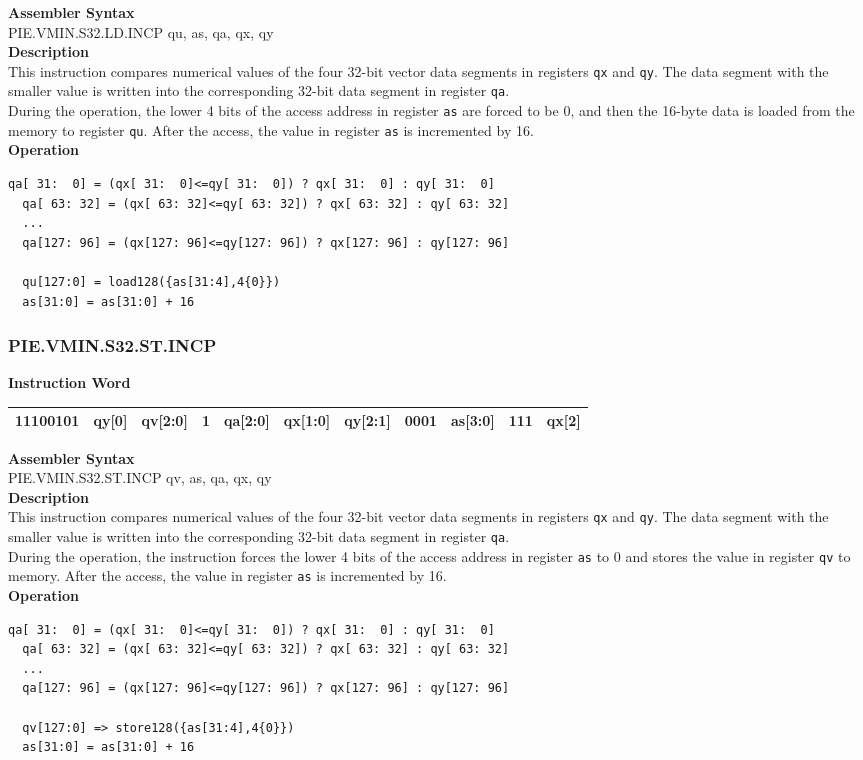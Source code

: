 \textbf{Assembler Syntax} \\
PIE.VMIN.S32.LD.INCP qu, as, qa, qx, qy \\
\textbf{Description} \\
This instruction compares numerical values of the four 32-bit vector data segments in registers \lstinline{qx} and \lstinline{qy}. The data segment with the smaller value is written into the corresponding 32-bit data segment in register \lstinline{qa}.\\
During the operation, the lower 4 bits of the access address in register \lstinline{as} are forced to be 0, and then the 16-byte data is loaded from the memory to register \lstinline{qu}. After the access, the value in register \lstinline{as} is incremented by 16.\\
\textbf{Operation}
\begin{lstlisting}[escapeinside=`?]
  qa[ 31:  0] = (qx[ 31:  0]<=qy[ 31:  0]) ? qx[ 31:  0] : qy[ 31:  0]
  qa[ 63: 32] = (qx[ 63: 32]<=qy[ 63: 32]) ? qx[ 63: 32] : qy[ 63: 32]
  ...
  qa[127: 96] = (qx[127: 96]<=qy[127: 96]) ? qx[127: 96] : qy[127: 96]

  qu[127:0] = load128({as[31:4],4{0}})
  as[31:0] = as[31:0] + 16
\end{lstlisting}

\newpage
\subsubsection{PIE.VMIN.S32.ST.INCP}\label{instruction:PIEVMINS32STINCP}
\setlength\tabcolsep{6pt}
\textbf{Instruction Word} \\
\begin{tabular}{|c|c|c|c|c|c|c|c|c|c|c|}
	\hline
	11100101 & qy[0] & qv[2:0] & 1 & qa[2:0] & qx[1:0] & qy[2:1] & 0001 & as[3:0] & 111 & qx[2] \\
	\hline
\end{tabular}

\textbf{Assembler Syntax} \\
PIE.VMIN.S32.ST.INCP qv, as, qa, qx, qy \\
\textbf{Description} \\
This instruction compares numerical values of the four 32-bit vector data segments in registers \lstinline{qx} and \lstinline{qy}. The data segment with the smaller value is written into the corresponding 32-bit data segment in register \lstinline{qa}.\\
During the operation, the instruction forces the lower 4 bits of the access address in register \lstinline{as} to 0 and stores the value in register \lstinline{qv} to memory. After the access, the value in register \lstinline{as} is incremented by 16.\\
\textbf{Operation}
\begin{lstlisting}[escapeinside=`?]
  qa[ 31:  0] = (qx[ 31:  0]<=qy[ 31:  0]) ? qx[ 31:  0] : qy[ 31:  0]
  qa[ 63: 32] = (qx[ 63: 32]<=qy[ 63: 32]) ? qx[ 63: 32] : qy[ 63: 32]
  ...
  qa[127: 96] = (qx[127: 96]<=qy[127: 96]) ? qx[127: 96] : qy[127: 96]

  qv[127:0] => store128({as[31:4],4{0}})
  as[31:0] = as[31:0] + 16
\end{lstlisting}

